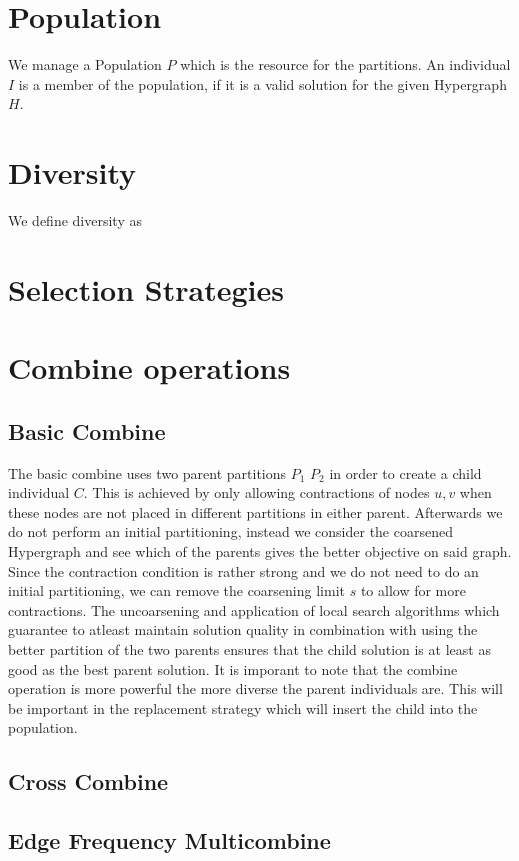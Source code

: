 \documentclass[a4paper,12pt,bibtotoc,titlepage, liststotoc,BCOR7mm,headsepline,pointlessnumbers]{scrbook}
\numberwithin{equation}{section}
\begin{document}
\section{Population}
We manage a Population $P$ which is the resource for the partitions.
An individual $I$ is a member of the population, if it is a valid solution
for the given Hypergraph $H$. 
\section{Diversity}
We define diversity as 
\section{Selection Strategies}

\section{Combine operations}
\subsection{Basic Combine}
The basic combine uses two parent partitions $P_1$ $P_2$ in order to create a child individual $C$. This is achieved by only allowing contractions of nodes $u, v$ when these nodes are not placed in different partitions in either parent. Afterwards we do not perform an initial partitioning, instead we consider the coarsened Hypergraph and see which of the parents gives the better objective on said graph. 
Since the contraction condition is rather strong and we do not need to do an initial partitioning, we can remove the coarsening limit $s$ 
to allow for more contractions. The uncoarsening and application of local search algorithms which guarantee to atleast maintain solution quality in combination with using the better partition of the two parents ensures that the child solution is at least as good as the best parent solution. It is imporant to note that the combine operation is more powerful the more diverse the parent individuals are. This will be important in the replacement strategy which will insert the child into the population. 
\subsection{Cross Combine}
\subsection{Edge Frequency Multicombine}
\end{document}
